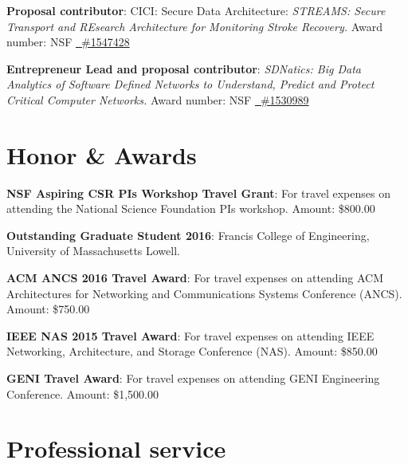 \documentclass[11pt]{moderncv}
\begin{document}
%
{\textbf{Proposal contributor}: CICI: Secure Data Architecture: \textit{STREAMS: Secure Transport and REsearch Architecture for Monitoring Stroke Recovery.} \newline
Award number: NSF \href{https://www.nsf.gov/awardsearch/showAward?AWD_ID=1547428}
  {\color{color2}\homepagesymbol~\#1547428} 
}

%
{\textbf{Entrepreneur Lead and proposal contributor}: \textit{SDNatics: Big Data Analytics of Software Defined Networks to Understand, Predict and Protect Critical Computer Networks.} \newline
Award number: NSF \href{https://www.nsf.gov/awardsearch/showAward?AWD_ID=1530989}
    {\color{color2}\homepagesymbol~\#1530989} \newline
}

\section{Honor \& Awards}
%
{\textbf{NSF Aspiring CSR PIs Workshop Travel Grant}: For travel expenses on attending the National Science Foundation PIs workshop. \newline
Amount: \$800.00
}

%
{\textbf{Outstanding Graduate Student 2016}: Francis College of Engineering, University of Massachusetts Lowell.
}

%
{\textbf{ACM ANCS 2016 Travel Award}: For travel expenses on attending ACM Architectures for Networking and Communications Systems Conference (ANCS). \newline
Amount: \$750.00
}

%
{\textbf{IEEE NAS 2015 Travel Award}: For travel expenses on attending IEEE Networking, Architecture, and Storage Conference (NAS). \newline
Amount: \$850.00
}

%
{\textbf{GENI Travel Award}: For travel expenses on attending GENI Engineering Conference. \newline
Amount: \$1,500.00
}

\section{Professional service}
%
\end{document}
